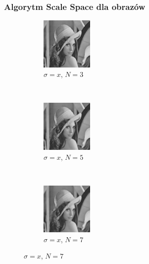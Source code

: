 \begin{frame}
	\frametitle{Algorytm Scale Space dla obrazów}


	\begin{figure}[h]
		\begin{center}
			\begin{subfigure}[b]{2.5cm}
				\centering
				\includegraphics[width=2.5cm]{Lena_scales1.jpg}
				\caption{$\sigma = x$, $N = 3$}
			\end{subfigure}
			~
			\begin{subfigure}[b]{2.5cm}
				\centering
				\includegraphics[width=2.5cm]{Lena_scales2.jpg}
				\caption{$\sigma = x$, $N = 5$}
			\end{subfigure}
			~
			\begin{subfigure}[b]{2.5cm}
				\centering
				\includegraphics[width=2.5cm]{Lena_scales3.jpg}
				\caption{$\sigma = x$, $N = 7$}
			\end{subfigure}



\end{center}
\end{figure}
\end{frame}
